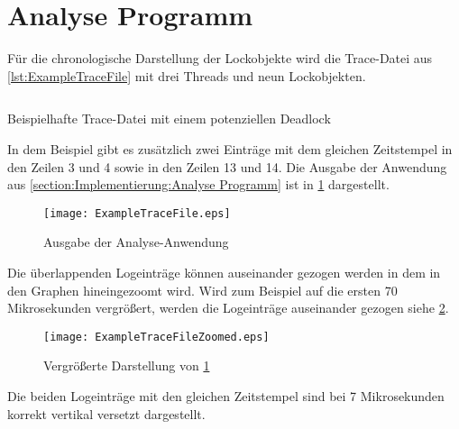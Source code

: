 \section{Analyse Programm}
\label{section:ValidierungAnalyseProgramm}
Für die chronologische Darstellung der Lockobjekte wird die Trace-Datei aus
\cref{lst:ExampleTraceFile} mit drei Threads und neun Lockobjekten.
\begin{listing}[ht]
  \begin{minipage}[ht]{\linewidth}
    \begin{multicols}{3}
      \inputminted[linenos]{text}{./Examples/ExampleTraceFile.log}
    \end{multicols}
    \caption{Beispielhafte Trace-Datei mit einem potenziellen Deadlock}
    \label{lst:ExampleTraceFile}
  \end{minipage}
\end{listing}
In dem Beispiel gibt es zusätzlich zwei Einträge mit dem gleichen Zeitstempel in
den Zeilen 3 und 4 sowie in den Zeilen 13 und 14. Die Ausgabe der Anwendung aus
\cref{section:Implementierung:Analyse Programm} ist in
\cref{fig:LockTraceVisualization} dargestellt.
\begin{figure}[ht]
  \texttt{[image: ExampleTraceFile.eps]}
  \caption{Ausgabe der Analyse-Anwendung}
  \label{fig:LockTraceVisualization}
\end{figure}
Die überlappenden Logeinträge können auseinander gezogen werden in dem in den
Graphen hineingezoomt wird. Wird zum Beispiel auf die ersten 70 Mikrosekunden
vergrößert, werden die Logeinträge auseinander gezogen siehe
\cref{fig:LockTraceVisualizationZoomed}.
\begin{figure}[ht]
  \texttt{[image: ExampleTraceFileZoomed.eps]}
  \caption{Vergrößerte Darstellung von \cref{fig:LockTraceVisualization}}
  \label{fig:LockTraceVisualizationZoomed}
\end{figure}
Die beiden Logeinträge mit den gleichen Zeitstempel sind bei 7 Mikrosekunden
korrekt vertikal versetzt dargestellt.

